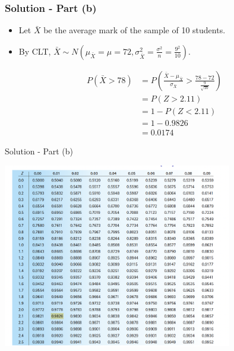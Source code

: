 \documentclass[12pt]{beamer}
\begin{document}
\begin{frame}
	\frametitle{Solution - Part (b)}
	
	\begin{itemize}[label={\color{blue}$\blacktriangleright$}]
		\item Let $\bar{X}$ be the average mark of the sample of 10 students.
		\item By CLT, $\bar{X} \sim N\left(\mu_{\bar{X}} = \mu = 72, \sigma^2_{\bar{X}} = \frac{\sigma^2}{n} = \frac{9^2}{10}\right)$.
	\end{itemize}
	
	\vspace{0.5em}
	
	\begin{align*}
		P(\bar{X} > 78) &= P\left(\frac{\bar{X} - \mu_{\bar{X}}}{\sigma_{\bar{X}}} > \frac{78 - 72}{\frac{9}{\sqrt{10}}}\right) \\[0.5em]
		&= P(Z > 2.11) \\[0.5em]
		&= 1 - P(Z < 2.11) \\[0.5em]
		&= 1 - 0.9826 \\[0.5em]
		&= 0.0174
	\end{align*}
	
\end{frame}
\begin{frame}{Solution - Part (b)}
	
	\centering
	\includegraphics[width=10cm]{ztable2.png}
	
\end{frame}
\end{document}
